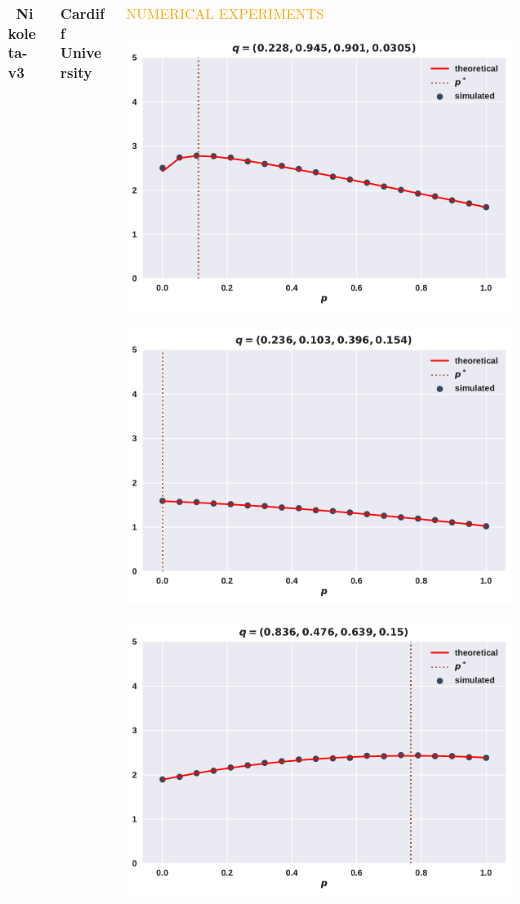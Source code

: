\documentclass[usenames,dvipsnames,t]{beamer}
\begin{document}
\begin{columns}
\begin{column}{.8\linewidth}
\begin{columns}
\begin{column}{.1\linewidth}
        \centering
        \textbf{ \faGithub \ Nikoleta-v3}
    \end{column}
    \begin{column}{.1\linewidth}

        \centering
        \textbf{Cardiff University}
    \end{column}
\end{columns}
\end{column}
    \begin{column}{.2\linewidth}
        \begin{center}
            \textcolor{orange}{\Large{NUMERICAL EXPERIMENTS}}
            \vspace{1cm}

            \includegraphics[width=.65\textwidth]{static/plot_one}
            \vspace{.2cm}

            \includegraphics[width=.65\textwidth]{static/plot_two}
            \vspace{.2cm}

            \includegraphics[width=.65\textwidth]{static/plot_three}
            \vspace{.2cm}


\end{center}
\end{column}
\end{columns}
\end{document}

